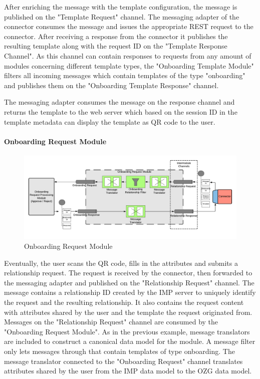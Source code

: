 After enriching the message with the template configuration, the message is published on the "Template Request" channel. The messaging adapter of the connector consumes the message and issues the appropriate REST request to the connector. After receiving a response from the connector it publishes the resulting template along with the request ID on the "Template Response Channel". As this channel can contain responses to requests from any amount of modules concerning different template types, the "Onboarding Template Module" filters all incoming messages which contain templates of the type "onboarding" and publishes them on the "Onboarding Template Response" channel.

The messaging adapter consumes the message on the response channel and returns the template to the web server which based on the session ID in the template metadata can display the template as QR code to the user.

\paragraph{Onboarding Request Module}

\begin{figure}[h!]
    \centering
    \includegraphics[scale=0.6]{Diagrams/Integration Architecture 1/Technological Integration/7. Onboarding Request Module.pdf}
    \caption{Onboarding Request Module}
    \label{integration1:onboarding_request_module}
\end{figure}

Eventually, the user scans the QR code, fills in the attributes and submits a relationship request. The request is received by the connector, then forwarded to the messaging adapter and published on the "Relationship Request" channel. The message contains a relationship ID created by the IMP server to uniquely identify the request and the resulting relationship. It also contains the request content with attributes shared by the user and the template the request originated from. Messages on the "Relationship Request" channel are consumed by the "Onboarding Request Module". As in the previous example, message translators are included to construct a canonical data model for the module. A message filter only lets messages through that contain templates of type onboarding. The message translator connected to the "Onboarding Request" channel translates attributes shared by the user from the IMP data model to the OZG data model.

